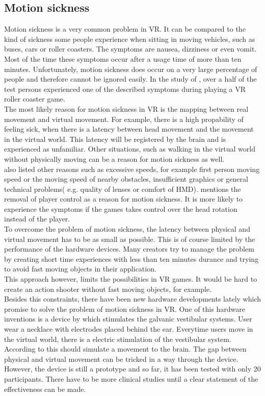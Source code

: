 \subsection{Motion sickness}
Motion sickness is a very common problem in VR. It can be compared to the kind of sickness some people experience when sitting in moving vehicles, such as buses, cars or roller coasters. The symptoms are nausea, dizziness or even vomit. Most of the time these symptoms occur after a usage time of more than ten minutes. Unfortunately, motion sickness does occur on a very large percentage of people and therefore cannot be ignored easily. In the study of \cite{Siess.2017}, over a half of the test persons experienced one of the described symptoms during playing a VR roller coaster game.\\
The most likely reason for motion sickness in VR is the mapping between real movement and virtual movement. For example, there is a high propability of feeling sick, when there is a latency between head movement and the movement in the virtual world. This latency  will be registered by the brain and is experienced as unfamiliar. Other situations, such as walking in the virtual world without physically moving can be a reason for motion sickness as well. \cite{Dorner.2013} \\ \cite{Siess.2017} also listed other reasons such as excessive speeds, for example first person moving speed or the moving speed of nearby obstacles, insufficient graphics or general technical problems( e.g. quality of lenses or comfort of HMD).
\cite{Fenlon.2013} mentions the removal of player control as a reason for motion sickness. It is more likely to experience the symptoms if the games takes control over the head rotation instead of the player. \\
To overcome the problem of motion sickness, the latency between physical and virtual movement has to be as small as possible. This is of course limited by the performance of the hardware devices. Many creators try to manage the problem by creating short time experiences with less than ten minutes durance and trying to avoid fast moving objects in their application. \cite{Doerner.2013}\\
This approach however, limits the possibilities in VR games. It would be hard to create an action shooter without fast moving objects, for example. \\
Besides this constraints, there have been new hardware developments lately which promise to solve the problem of motion sickness in VR. One of this hardware inventions is a device by \cite{Sra:2019} which stimulates the galvanic vestibular systems. User wear a necklace with electrodes placed behind the ear. Everytime users move in the virtual world, there is a electric stimulation of the vestibular system. According to \cite{Sra:2019} this should simulate a movement to the brain. The gap between physical and virtual movement can be tricked in a way through the device. However, the device is still a prototype and so far, it has been tested with only 20 participants. There have to be more clinical studies until a clear statement of the effectiveness can be made.\\
